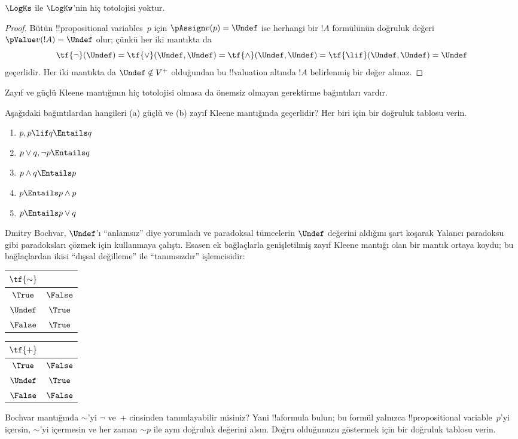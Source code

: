 \begin{prop}
  $\LogKs$ ile $\LogKw$'nin hiç totolojisi yoktur.
\end{prop}

\begin{proof}
  Bütün !!{propositional variable}s~$p$ için
  $\pAssign v(p) = \Undef$ ise herhangi bir $!A$ formülünün doğruluk değeri
  $\pValue v(!A) = \Undef$ olur; çünkü her iki mantıkta da
  \[
    \tf{\lnot}(\Undef) = \tf{\lor}(\Undef, \Undef) = \tf{\land}(\Undef,
  \Undef) = \tf{\lif}(\Undef, \Undef) = \Undef
  \]
  geçerlidir. Her iki mantıkta da $\Undef \notin V^+$ olduğundan bu
  !!{valuation} altında $!A$ belirlenmiş bir değer almaz.
\end{proof}

Zayıf ve güçlü Kleene mantığının hiç totolojisi olmasa da önemsiz olmayan
gerektirme bağıntıları vardır.

\begin{prob}
  Aşağıdaki bağıntılardan hangileri (a) güçlü ve (b) zayıf Kleene mantığında
  geçerlidir? Her biri için bir doğruluk tablosu verin.
  \begin{enumerate}
    \item $p, p \lif q \Entails q$
    \item $p \lor q, \lnot p \Entails q$
    \item $p \land q \Entails p$
    \item $p \Entails p \land p$
    \item $p \Entails p \lor q$
  \end{enumerate}
\end{prob}

Dmitry Bochvar, $\Undef$'ı “anlamsız” diye yorumladı ve paradoksal tümcelerin
$\Undef$ değerini aldığını şart koşarak Yalancı paradoksu gibi paradoksları
çözmek için kullanmaya çalıştı. Esasen ek bağlaçlarla genişletilmiş zayıf
Kleene mantığı olan bir mantık ortaya koydu; bu bağlaçlardan ikisi “dışsal
değilleme” ile “tanımsızdır” işlemcisidir:
\begin{center}
  \begin{tabular}{c|c} 
    $\tf{\sim}$ & \\ 
    \hline  
    $\True$ & $\False$ \\ 
    $\Undef$ & $\True$ \\
    $\False$ & $\True$ 
  \end{tabular}
\quad
  \begin{tabular}{c|c} 
    $\tf{+}$ & \\ 
    \hline  
    $\True$ & $\False$ \\ 
    $\Undef$ & $\True$ \\
    $\False$ & $\False$ 
  \end{tabular}
\end{center}

\begin{prob}
  Bochvar mantığında $\sim$'yi $\lnot$ ve~$+$ cinsinden tanımlayabilir
  misiniz? Yani !!a{formula} bulun; bu formül yalnızca
  !!{propositional variable}~$p$'yi içersin, $\sim$'yi içermesin ve her zaman
  $\mathord{\sim}p$ ile aynı doğruluk değerini alsın. Doğru olduğunuzu
  göstermek için bir doğruluk tablosu verin.
\end{prob}


